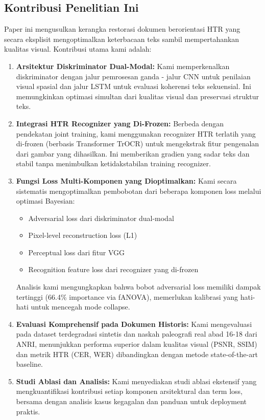 \documentclass[journal]{IEEEtran}
\begin{document}
\subsection{Kontribusi Penelitian Ini}

Paper ini mengusulkan kerangka restorasi dokumen berorientasi HTR yang secara eksplisit mengoptimalkan keterbacaan teks sambil mempertahankan kualitas visual. Kontribusi utama kami adalah:

\begin{enumerate}
    \item \textbf{Arsitektur Diskriminator Dual-Modal:} Kami memperkenalkan diskriminator dengan jalur pemrosesan ganda - jalur CNN untuk penilaian visual spasial dan jalur LSTM untuk evaluasi koherensi teks sekuensial. Ini memungkinkan optimasi simultan dari kualitas visual dan preservasi struktur teks.
    
    \item \textbf{Integrasi HTR Recognizer yang Di-Frozen:} Berbeda dengan pendekatan joint training, kami menggunakan recognizer HTR terlatih yang di-frozen (berbasis Transformer TrOCR) untuk mengekstrak fitur pengenalan dari gambar yang dihasilkan. Ini memberikan gradien yang sadar teks dan stabil tanpa menimbulkan ketidakstabilan training recognizer.
    
    \item \textbf{Fungsi Loss Multi-Komponen yang Dioptimalkan:} Kami secara sistematis mengoptimalkan pembobotan dari beberapa komponen loss melalui optimasi Bayesian:
    \begin{itemize}
        \item Adversarial loss dari diskriminator dual-modal
        \item Pixel-level reconstruction loss (L1)
        \item Perceptual loss dari fitur VGG
        \item Recognition feature loss dari recognizer yang di-frozen
    \end{itemize}
    Analisis kami mengungkapkan bahwa bobot adversarial loss memiliki dampak tertinggi (66.4\% importance via fANOVA), memerlukan kalibrasi yang hati-hati untuk mencegah mode collapse.
    
    \item \textbf{Evaluasi Komprehensif pada Dokumen Historis:} Kami mengevaluasi pada dataset terdegradasi sintetis dan naskah paleografi real abad 16-18 dari ANRI, menunjukkan performa superior dalam kualitas visual (PSNR, SSIM) dan metrik HTR (CER, WER) dibandingkan dengan metode state-of-the-art baseline.
    
    \item \textbf{Studi Ablasi dan Analisis:} Kami menyediakan studi ablasi ekstensif yang mengkuantifikasi kontribusi setiap komponen arsitektural dan term loss, bersama dengan analisis kasus kegagalan dan panduan untuk deployment praktis.
\end{enumerate}
\end{document}
